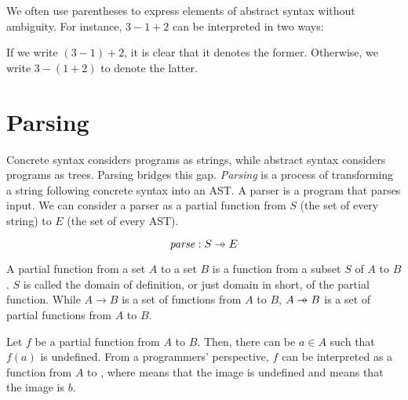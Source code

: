We often use parentheses to express elements of abstract syntax without
ambiguity. For instance, $3-1+2$ can be interpreted in two ways:

\begin{center}
\end{center}

If we write $(3-1)+2$, it is clear that it denotes the former. Otherwise, we
write $3-(1+2)$ to denote the latter.

\section{Parsing}

Concrete syntax considers programs as strings, while abstract syntax considers
programs as trees. Parsing bridges this gap. \textit{Parsing} is
a process of transforming a string following concrete syntax into an AST. A
parser is a program that parses input. We can consider a parser as a partial
function from $S$ (the set of every string) to $E$ (the set of
every AST).

\[\embox{parse}: S\pto E\]

\begin{kaobox}[frametitle=Partial functions]
  A partial function from a set $A$ to a set $B$ is a function from a subset $S$ of
  $A$ to $B$. $S$ is called the domain of definition, or just domain in short, of the partial function.
  While $A\rightarrow B$ is a set of functions from $A$ to $B$, $A\pto B$ is a set
  of partial functions from $A$ to $B$.

  Let $f$ be a partial function from $A$ to $B$. Then, there can be $a\in A$ such
  that $f(a)$ is undefined. From a programmers' perspective, $f$ can be
  interpreted as a function from $A$ to , where 
  means that the image is undefined and  means that the image is
  $b$.
\end{kaobox}

